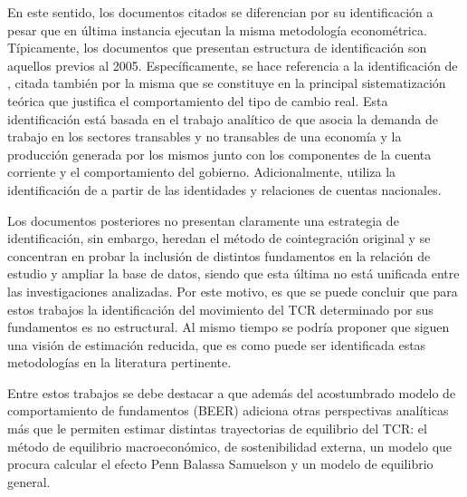 \documentclass[12pt,letterpaper]{article}
\begin{document}
En este sentido, los documentos citados se diferencian por su identificación a pesar que en última instancia ejecutan la misma metodología econométrica. Típicamente, los documentos que presentan estructura de identificación son aquellos previos al 2005. Específicamente, se hace referencia a la identificación de \cite{lora2000tipo}, citada también por \cite{aguilar2003estimacion} la misma que se constituye en la principal sistematización teórica que justifica el comportamiento del tipo de cambio real. Esta identificación está basada en el trabajo analítico de \cite{hinkle1999exchange} que asocia la demanda de trabajo en los sectores transables y no transables de una economía y la producción generada por los mismos junto con los componentes de la cuenta corriente y el comportamiento del gobierno. Adicionalmente, \cite{humerez2005reexaminando} utiliza la identificación de \cite{elbadawi1994estimating} a partir de las identidades y relaciones de cuentas nacionales. 

Los documentos posteriores no presentan claramente una estrategia de identificación, sin embargo, heredan el método de cointegración original y se concentran en probar la inclusión de distintos fundamentos en la relación de estudio y ampliar la base de datos, siendo que esta última no está unificada entre las investigaciones analizadas. Por este motivo, es que se puede concluir que para estos trabajos la identificación del movimiento del TCR determinado por sus fundamentos es no estructural. Al mismo tiempo se podría proponer que siguen una visión de estimación reducida, que es como puede ser identificada estas metodologías en la literatura pertinente.

Entre estos trabajos se debe destacar a \cite{cerezo2011tipo} que además del acostumbrado modelo de comportamiento de fundamentos (BEER) adiciona otras perspectivas analíticas más que le permiten estimar distintas trayectorias de equilibrio del TCR: el método de equilibrio macroeconómico, de sostenibilidad externa, un modelo que procura calcular el efecto Penn Balassa Samuelson y un modelo de equilibrio general. 
\end{document}
